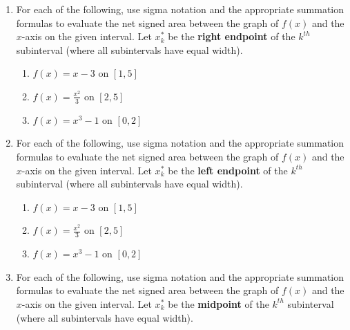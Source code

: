 \documentclass[12pt]{article}
\newif\ifans
\begin{document}
\begin{enumerate}
\begin{enumerate}
\ifans{\fbox{$\frac{230}{3}$}}\fi

\end{enumerate}

\item For each of the following, use sigma notation and the appropriate summation formulas to evaluate the net signed area between the graph of $f(x)$ and the $x$-axis on the given interval.  Let $x_k^*$ be the {\bf right endpoint} of the $k^{th}$ subinterval (where all subintervals have equal width).

\begin{enumerate}

\item $f(x)=x-3$ on $[1,5]$

\ifans{\fbox{0}} \fi

\item $f(x)=\frac{x^2}{3}$ on $[2,5]$

\ifans{\fbox{13}} \fi

\item $f(x)=x^3-1$ on $[0,2]$

\ifans{\fbox{2}} \fi

\end{enumerate}

\item For each of the following, use sigma notation and the appropriate summation formulas to evaluate the net signed area between the graph of $f(x)$ and the $x$-axis on the given interval.  Let $x_k^*$ be the {\bf left endpoint} of the $k^{th}$ subinterval (where all subintervals have equal width).

\begin{enumerate}

\item $f(x)=x-3$ on $[1,5]$

\ifans{\fbox{0}} \fi

\item $f(x)=\frac{x^2}{3}$ on $[2,5]$

\ifans{\fbox{13}} \fi

\item $f(x)=x^3-1$ on $[0,2]$

\ifans{\fbox{2}} \fi

\end{enumerate}

\item For each of the following, use sigma notation and the appropriate summation formulas to evaluate the net signed area between the graph of $f(x)$ and the $x$-axis on the given interval.  Let $x_k^*$ be the {\bf midpoint} of the $k^{th}$ subinterval (where all subintervals have equal width).


\end{enumerate}
\end{document}

